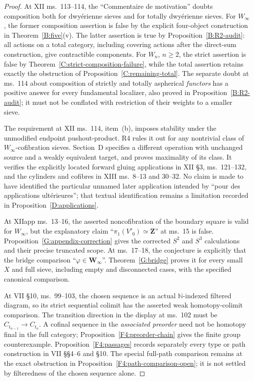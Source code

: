 \documentclass[11pt,a4paper]{article}
\theoremstyle{definition}
\theoremstyle{remark}
\newcommand{\N}{\mathbb N}
\newcommand{\Winfty}{W_\infty}
\begin{document}
\begin{proof}
At XII ms.~113--114, the ``Commentaire de motivation'' doubts composition both for dwy\'erienne sieves and for totally dwy\'erienne sieves. For $\Winfty$, the former composition assertion is false by the explicit four-object construction in Theorem~\ref{B:five}(v). The latter assertion is true by Proposition~\ref{B:R2-audit}: all actions on a total category, including covering actions after the direct-sum construction, give contractible components. For $W_n$, $n\geq2$, the strict assertion is false by Theorem~\ref{C:strict-composition-failure}, while the total assertion retains exactly the obstruction of Proposition~\ref{C:remaining-total}. The separate doubt at ms.~114 about composition of strictly and totally aspherical \emph{functors} has a positive answer for every fundamental localizer, also proved in Proposition~\ref{B:R2-audit}; it must not be conflated with restriction of their weights to a smaller sieve.

The requirement at XII ms.~114, item~(b), imposes stability under the unmodified endpoint pushout-product. R4 rules it out for any nontrivial class of $\Winfty$-cofibration sieves. Section~D specifies a different operation with unchanged source and a weakly equivalent target, and proves maximality of its class. It verifies the explicitly located forward gluing applications in XII \S3, ms.~121--132, and the cylinders and cofibres in XIII ms.~8--13 and 30--32. No claim is made to have identified the particular unnamed later application intended by ``pour des applications ult\'erieures''; that textual identification remains a limitation recorded in Proposition~\ref{D:applications}.

At XIIapp ms.~13--16, the asserted noncofibration of the boundary square is valid for $\Winfty$, but the explanatory claim ``$\pi_1(V'_0)\simeq\mathbf Z$'' at ms.~15 is false. Proposition~\ref{G:appendix-correction} gives the corrected $S^2$ and $S^3$ calculations and their precise truncated scope. At ms.~17--18, the conjecture is explicitly that the bridge comparison ``$\varphi\in\mathbf W_\infty$''. Theorem~\ref{G:bridge} proves it for every small $X$ and full sieve, including empty and disconnected cases, with the specified canonical comparison.

At VII \S10, ms.~99--103, the chosen sequence is an actual $\N$-indexed filtered diagram, so its strict sequential colimit has the asserted weak homotopy-colimit comparison. The transition direction in the display at ms.~102 must be $C_{t_{n-1}}\to C_{t_n}$. A cofinal sequence in the \emph{associated preorder} need not be homotopy final in the full category; Proposition~\ref{F4:preorder-chain} gives the finite group counterexample. Proposition~\ref{F4:passages} records separately every type or path construction in VII \S\S4--6 and \S10. The special full-path comparison remains at the exact obstruction in Proposition~\ref{F4:path-comparison-open}; it is not settled by filteredness of the chosen sequence alone.


\end{proof}
\end{document}
